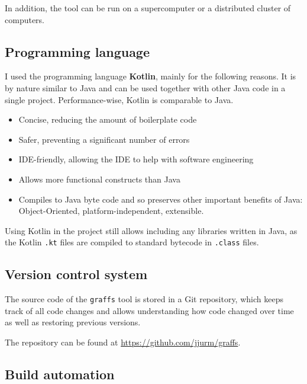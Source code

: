         In addition, the tool can be run on a supercomputer or a distributed cluster of computers.
    
    \subsection{Programming language}
    
        I used the programming language \textbf{Kotlin}, mainly for the following reasons. It is by nature similar to Java and can be used together with other Java code in a single project. Performance-wise, Kotlin is comparable to Java.
    	\begin{itemize}
    	    \item Concise, reducing the amount of boilerplate code
    	    \item Safer, preventing a significant number of errors
    	    \item IDE-friendly, allowing the IDE to help with software engineering
    	    \item Allows more functional constructs than Java
    	    \item Compiles to Java byte code and so preserves other important benefits of Java: Object-Oriented, platform-independent, extensible.
    	\end{itemize}
    	
    	Using Kotlin in the project still allows including any libraries written in Java, as the Kotlin \texttt{.kt} files are compiled to standard bytecode in \texttt{.class} files.
    
    \subsection{Version control system}
    
        The source code of the \texttt{graffs} tool is stored in a Git repository, which keeps track of all code changes and allows understanding how code changed over time as well as restoring previous versions.
        
        The repository can be found at \url{https://github.com/jjurm/graffs}.

    \subsection{Build automation}
    
